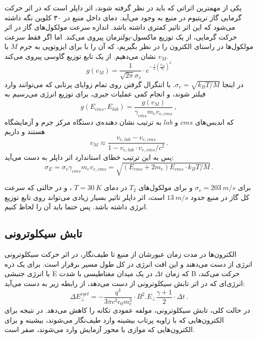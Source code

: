 \documentclass[a4paper,11pt,oneside,openany]{iut-thesis}
\begin{document}
یکی از مهمترین اثراتی که باید در نظر گرفته شوند، اثر داپلر است که در اثر حرکت گرمایی گاز تریتیوم در منبع به وجود می‌آید. دمای داخل منبع در ۳۰ کلوین نگه داشته می‌شود که این اثر تاثیر کمتری داشته باشد. اندازه سرعت مولکول‌های گاز در اثر حرکت گرمایی، از یک توزیع ماکسول-بولتزمان پیروی می‌کند. اما اگر فقط سرعت مولکول‌ها در راستای الکترون را در نظر بگیریم، که آن را با برای ایزوتوپی به جرم $M$ با
$v_{M}$ 
نشان می‌دهیم. از یک تابع توزیع گاوسی پیروی می‌کند.
\begin{equation}
g(v_{M}) = \frac{1}{\sqrt{2\pi}\sigma_{v}} \cdot e^{-\frac{1}{2} (\frac{v_{M}}{\sigma_{v}})^{2}}
\end{equation}
در اینجا 
$\sigma_{v} = \sqrt{k_{B}T/M}$.
با انتگرال گرفتن روی تمام زوایای پرتابی که می‌توانند وارد فیلتر شوند، و انجام کمی عملیات جبری، برای توزیع انرژی می‌رسیم به
\begin{equation}
g(E_{cms}, E_{lab}) = \frac{g(v_{M})}{\gamma_{cms} m_{e} v_{e,cms}}\,,
\end{equation}
که اندیس‌های $cms$ و $lab$ به ترتیب نشان دهنده‌ی دستگاه مرکز جرم و آزمایشگاه هستند و داریم
\begin{equation}
v_{M} \approx \frac{v_{e,lab} - v_{e,cms}}{1 - v_{e,lab} \cdot v_{e,cms}/c^{2}}\,.
\end{equation}
پس به این ترتیب خطای استاندارد اثر داپلر به دست می‌آید:
\begin{equation}
\sigma_{E} = \sigma_{v} \gamma_{cms} m_{e} v_{e,cms} = \sqrt{(E_{cms}+2m_{e})E_{cms} \cdot k_{B} T/M}\,.
\end{equation}

برای 
$\sigma_{v} = 203~m/s$ 
و برای مولکول‌های 
$T_{2}$ 
در دمای $T = 30~K$
، و در حالتی که سرعت کل گاز در منبع حدود $13~m/s$ است، اثر داپلر تاثیر بسیار زیادی می‌تواند روی تابع توزیع انرژی داشته باشد. پس حتما باید آن را لحاظ کنیم.

\subsection{
تابش سیکلوترونی
}
الکترون‌ها در مدت زمان عبورشان از منبع تا طیف‌نگار، در اثر حرکت سیکلوترونی انرژی از دست می‌دهند و این افت انرژی در کل طول مسیر برقرار است. برای یک ذره با انرژی جنبشی E که زمان $\Delta t$ در یک میدان مغناطیسی با شدت B حرکت می‌کند، انرژی‌ای که در اثر تابش سیکلوترونی از دست می‌دهد، از رابطه زیر به دست می‌آید:
\begin{equation}
\Delta E^{cycl}_{\bot} = -\frac{q^{4}}{3 \pi c^{3} \epsilon_{0} m_{e}^{3}} \cdot B^{2} . E_{\bot} \frac{\gamma + 1}{2} \cdot \Delta t \,.
\end{equation}
در حالت کلی، تابش سیکلوترونی، مولفه عمودی تکانه را کاهش می‌دهد. در نتیجه برای الکترون‌هایی که با زاویه پرتاب بیشینه وارد طیف‌نگار می‌شوند، بیشینه و برای الکترون‌هایی که موازی با محور آزمایش وارد می‌شوند، صفر است.
\end{document}
